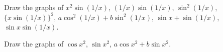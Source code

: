 Draw the graphs of $x^{2}\sin(1/x)$, $(1/x)\sin(1/x)$, $\sin^{2}(1/x)$, $\{x\sin(1/x)\}^{2}$,
$a\cos^{2}(1/x) + b\sin^{2}(1/x)$, $\sin x + \sin(1/x)$, $\sin x\sin(1/x)$.

Draw the graphs of $\cos x^{2}$, $\sin x^{2}$, $a\cos x^{2} + b\sin x^{2}$.


